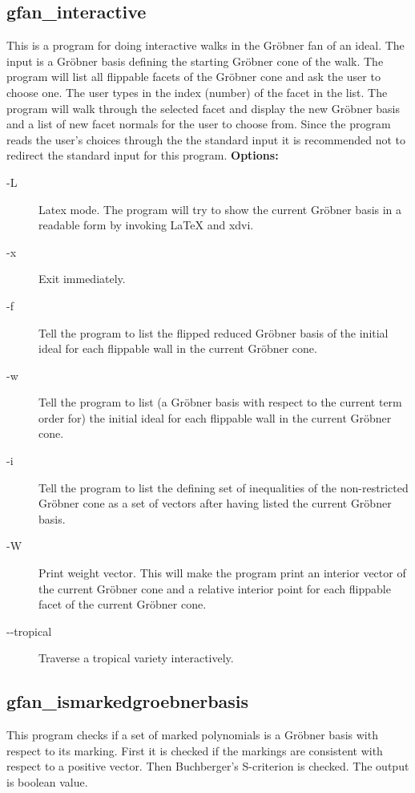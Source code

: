 {{{{{{{{{{{{{{{{{\subsection{gfan\_interactive}\label{applist:_interactive}
This is a program for doing interactive walks in the Gr\"obner fan of an ideal. The input is a Gr\"obner basis defining the starting Gr\"obner cone of the walk. The program will list all flippable facets of the Gr\"obner cone and ask the user to choose one. The user types in the index (number) of the facet in the list. The program will walk through the selected facet and display the new Gr\"obner basis and a list of new facet normals for the user to choose from. Since the program reads the user's choices through the the standard input it is recommended not to redirect the standard input for this program.
\newline
{\bf Options:}
\begin{description}
\item[-L]Latex mode. The program will try to show the current Gr\"obner basis in a readable form by invoking LaTeX and xdvi.
\item[-x]Exit immediately.
\item[-f]Tell the program to list the flipped reduced Gr\"obner basis of the initial ideal for each flippable wall in the current Gr\"obner cone.
\item[-w]Tell the program to list (a Gr\"obner basis with respect to the current term order for) the initial ideal for each flippable wall in the current Gr\"obner cone.
\item[-i]Tell the program to list the defining set of inequalities of the non-restricted Gr\"obner cone as a set of vectors after having listed the current Gr\"obner basis.
\item[-W]Print weight vector. This will make the program print an interior vector of the current Gr\"obner cone and a relative interior point for each flippable facet of the current Gr\"obner cone.
\item[-\hspace{0.013cm}-tropical]Traverse a tropical variety interactively.\end{description}


{\subsection{gfan\_ismarkedgroebnerbasis}\label{applist:_ismarkedgroebnerbasis}
This program checks if a set of marked polynomials is a Gr\"obner basis with respect to its marking. First it is checked if the markings are consistent with respect to a positive vector. Then Buchberger's S-criterion is checked. The output is boolean value.


}}}}}}}}}}}}}}}}}}
